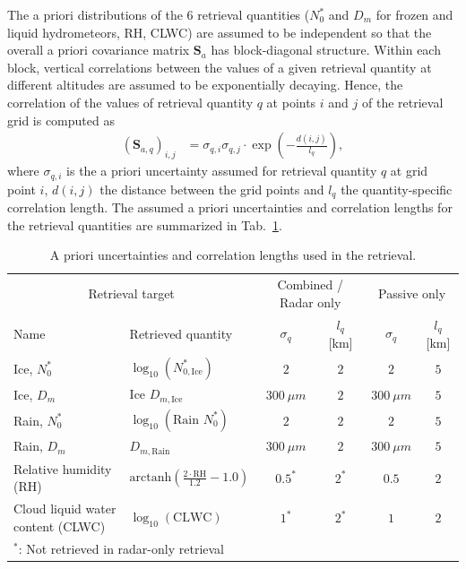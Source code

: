 \documentclass[journal abbreviation, manuscript]{copernicus}
\begin{document}
The a priori distributions of the 6 retrieval quantities ($N_0^*$ and $D_m$ for
frozen and liquid hydrometeors, RH, CLWC) are assumed to be independent so that
the overall a priori covariance matrix $\mathbf{S}_a$ has block-diagonal
structure. Within each block, vertical correlations between the values of a
given retrieval quantity at different altitudes are assumed to be exponentially
decaying. Hence, the correlation of the values of retrieval quantity $q$ at
points $i$ and $j$ of the retrieval grid is computed as
%
\begin{align}
\left ( \mathbf{S}_{a,q} \right )_{i, j} &= \sigma_{q,i} \sigma_{q,j}
 \cdot \exp  \left ( -\frac{d(i, j)}{l_q} \right ),
\end{align}
%
where $\sigma_{q, i}$ is the a priori uncertainty assumed for retrieval
quantity $q$ at grid point $i$, $d(i, j)$ the distance between the grid
points and $l_q$ the quantity-specific correlation length. The assumed
a priori uncertainties and correlation lengths for the retrieval quantities
are summarized in Tab.~\ref{tab:a_priori}.

\begin{table}[h!]
\caption{A priori uncertainties and correlation
 lengths used in the retrieval.}
 \centering
\label{tab:a_priori}
    \begin{tabular}{ll|cc|cc|}
      \multicolumn{2}{c|}{Retrieval target}  & \multicolumn{2}{c|}{Combined / Radar only} & \multicolumn{2}{c}{Passive only}\\
      Name & Retrieved quantity &  $\sigma_q$ & $l_q$ [km] & $\sigma_q$ & $l_q$ [km]\\
    \hline
Ice, $N_0^*$ & $\log_{10}(N_{0, \text{Ice}}^*)$ & $2$ & $2$ & $2$ &$5$ \\
Ice, $D_m$ &   $\text{Ice }D_{m, \text{Ice}}$   & $300\ \unit{\mu m}$  & $2$ & $300\ \unit{\mu m}$          & $5$ \\
Rain, $N_0^*$ &    $\log_{10}(\text{Rain } N_{0}^*)$ & $2$ & $2$ & $2$ &$5$ \\
Rain, $D_m$ &  $D_{m, \text{Rain}}$   & $300\ \unit{\mu m}$  & $2$ & $300\ \unit{\mu m}$          & $5$ \\
Relative humidity (RH) & $\text{arctanh}(\frac{2 \cdot \text{RH}}{1.2} - 1.0)$ & $0.5^{*}$ & $2^{*}$ & $0.5$ & $2$ \\
Cloud liquid water content (CLWC) & $\log_{10}(\text{CLWC}) $ & $1^{*}$ & $2^{*}$  & $1$ & $2$ \\
\multicolumn{6}{l}{$^*$: Not retrieved in radar-only retrieval}
    \end{tabular}
\end{table}
\end{document}
